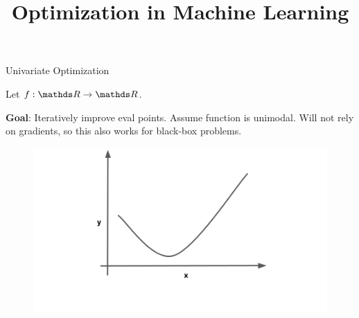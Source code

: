 \documentclass[11pt,compress,t,notes=noshow, xcolor=table]{beamer}
\title{Optimization in Machine Learning}
\date{}
\begin{document}
\sloppy

\begin{vbframe}{Univariate Optimization}

Let $f: \R \to \R$. 

\lz 

\textbf{Goal}: Iteratively improve eval points. Assume function is unimodal. Will not rely on gradients, so this also works for black-box problems.

\vspace*{-0.2cm} 

\begin{figure}
  \includegraphics{figure_man/golden-ratio-0.png}
\end{figure}

\end{vbframe}
\end{document}
